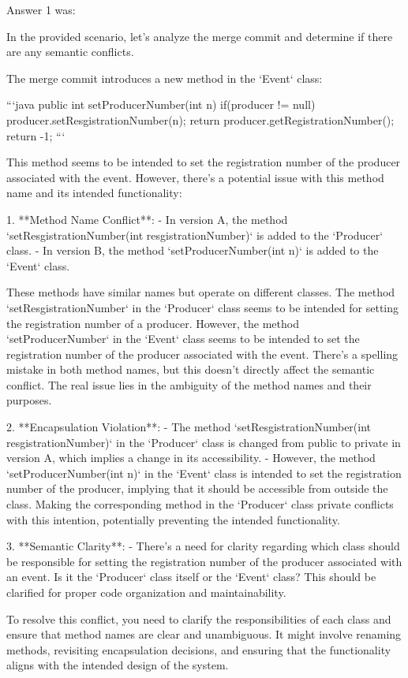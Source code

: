 Answer 1 was:
\begin{spverbatim}
In the provided scenario, let's analyze the merge commit and determine if there are any semantic conflicts.

The merge commit introduces a new method in the `Event` class:

```java
public int setProducerNumber(int n){
    if(producer != null){
        producer.setResgistrationNumber(n);
        return producer.getRegistrationNumber();
    }
    return -1;
}
```

This method seems to be intended to set the registration number of the producer associated with the event. However, there's a potential issue with this method name and its intended functionality:

1. **Method Name Conflict**:
   - In version A, the method `setResgistrationNumber(int resgistrationNumber)` is added to the `Producer` class.
   - In version B, the method `setProducerNumber(int n)` is added to the `Event` class.

These methods have similar names but operate on different classes. The method `setResgistrationNumber` in the `Producer` class seems to be intended for setting the registration number of a producer. However, the method `setProducerNumber` in the `Event` class seems to be intended to set the registration number of the producer associated with the event. There's a spelling mistake in both method names, but this doesn't directly affect the semantic conflict. The real issue lies in the ambiguity of the method names and their purposes.

2. **Encapsulation Violation**:
   - The method `setResgistrationNumber(int resgistrationNumber)` in the `Producer` class is changed from public to private in version A, which implies a change in its accessibility.
   - However, the method `setProducerNumber(int n)` in the `Event` class is intended to set the registration number of the producer, implying that it should be accessible from outside the class. Making the corresponding method in the `Producer` class private conflicts with this intention, potentially preventing the intended functionality.

3. **Semantic Clarity**:
   - There's a need for clarity regarding which class should be responsible for setting the registration number of the producer associated with an event. Is it the `Producer` class itself or the `Event` class? This should be clarified for proper code organization and maintainability.

To resolve this conflict, you need to clarify the responsibilities of each class and ensure that method names are clear and unambiguous. It might involve renaming methods, revisiting encapsulation decisions, and ensuring that the functionality aligns with the intended design of the system.
\end{spverbatim}

